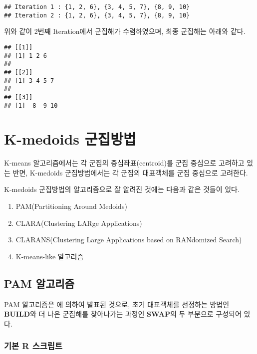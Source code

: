 \documentclass[
]{book}
\newenvironment{Shaded}{\begin{snugshade}}{\end{snugshade}}
\newcommand{\NormalTok}[1]{#1}
\newcommand{\SpecialCharTok}[1]{\textcolor[rgb]{0.00,0.00,0.00}{#1}}
\providecommand{\tightlist}{%
  \setlength{\itemsep}{0pt}\setlength{\parskip}{0pt}}
\begin{document}
\begin{verbatim}
## Iteration 1 : {1, 2, 6}, {3, 4, 5, 7}, {8, 9, 10} 
## Iteration 2 : {1, 2, 6}, {3, 4, 5, 7}, {8, 9, 10}
\end{verbatim}

위와 같이 2번째 Iteration에서 군집해가 수렴하였으며, 최종 군집해는 아래와 같다.

\begin{Shaded}
\end{Shaded}

\begin{verbatim}
## [[1]]
## [1] 1 2 6
## 
## [[2]]
## [1] 3 4 5 7
## 
## [[3]]
## [1]  8  9 10
\end{verbatim}

\hypertarget{kmedoids}{%
\section{K-medoids 군집방법}\label{kmedoids}}

K-means 알고리즘에서는 각 군집의 중심좌표(centroid)를 군집 중심으로 고려하고 있는 반면, K-medoids 군집방법에서는 각 군집의 대표객체를 군집 중심으로 고려한다.

K-medoids 군집방법의 알고리즘으로 잘 알려진 것에는 다음과 같은 것들이 있다.

\begin{enumerate}
\def\labelenumi{\arabic{enumi}.}
\tightlist
\item
  PAM(Partitioning Around Medoids)
\item
  CLARA(Clustering LARge Applications)
\item
  CLARANS(Clustering Large Applications based on RANdomized Search)
\item
  K-means-like 알고리즘
\end{enumerate}

\hypertarget{pam}{%
\subsection{PAM 알고리즘}\label{pam}}

PAM 알고리즘은 \citet{kaufman1990finding} 에 의하여 발표된 것으로, 초기 대표객체를 선정하는 방법인 \textbf{BUILD}와 더 나은 군집해를 찾아나가는 과정인 \textbf{SWAP}의 두 부분으로 구성되어 있다.

\hypertarget{pam-basic-script}{%
\subsubsection{기본 R 스크립트}\label{pam-basic-script}}
\end{document}
